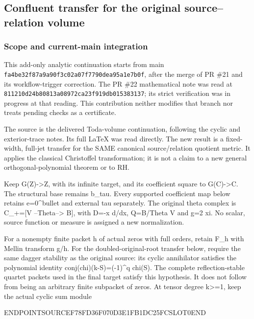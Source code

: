 \subsection{Confluent transfer for the original source--relation volume}\label{endpoint-pr24_current_corrected--confluent-transfer-for-the-original-sourcerelation-volume}

\subsubsection{Scope and current-main integration}\label{endpoint-pr24_current_corrected--scope-and-current-main-integration}

This add-only analytic continuation starts from main \texttt{fa4be32f87a9a90f3c02a07f7790dea95a1e7b0f}, after the merge of PR \#21 and its workflow-trigger correction. The PR \#22 mathematical note was read at \texttt{811210d24b80813a08972ca23f919db015383137}; its strict verification was in progress at that reading. This contribution neither modifies that branch nor treats pending checks as a certificate.

The source is the delivered Toda-volume continuation, following the cyclic and exterior-trace notes. Its full LaTeX was read directly. The new result is a fixed-width, full-jet transfer for the SAME canonical source/relation quotient metric. It applies the classical Christoffel transformation; it is not a claim to a new general orthogonal-polynomial theorem or to RH.

Keep G(Z)-\textgreater Z, with its infinite target, and its coefficient square to G(C)-\textgreater C. The structural base remains b\_tau. Every supported coefficient map below retains e=0\^{}bullet and external tau separately. The original theta complex is C\_+={[}V --Theta--\textgreater{} B{]}, with D=-x d/dx, Q=B/Theta V and g=2 xi. No scalar, source function or measure is assigned a new normalization.

For a nonempty finite packet h of actual zeros with full orders, retain F\_h with Mellin transform g/h. For the doubled-original-root transfer below, require the same dagger stability as the original source: its cyclic annihilator satisfies the polynomial identity conj(chi)(k-S)=(-1)\^{}q chi(S). The complete reflection-stable quartet packets used in the final target satisfy this hypothesis. It does not follow from being an arbitrary finite subpacket of zeros. At tensor degree k\textgreater=1, keep the actual cyclic sum module

ENDPOINTSOURCEF78FD36F070D3E1FB1DC25FCSLOT0END

